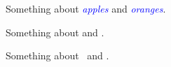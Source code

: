 \documentclass{article}
\newcommand\kw[2][blue]{\textcolor{#1}{\itshape #2}}
\begin{document}
Something about \kw{apples} and \kw{oranges}.

Something about  and .

Something about \kwthree \ and \kwthree.
\end{document}
